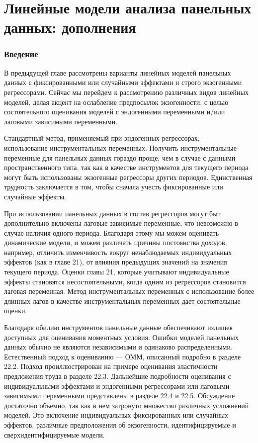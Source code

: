 
\chapter{Линейные модели анализа панельных данных: дополнения}

\subsection{Введение}
В предыдущей главе рассмотрены варианты линейных моделей панельных данных с фиксированными или случайными эффектами и строго экзогенными регрессорами. Сейчас мы перейдем к рассмотрению различных видов линейных моделей, делая акцент на ослабление предпосылок экзогенности, с целью состоятельного оценивания моделей с эндогенными переменными и/или лаговыми зависимыми переменными.

Стандартный метод, применяемый при эндогенных регрессорах, --- использование инструментальных переменных. Получить инструментальные переменные для панельных данных гораздо проще, чем в случае с данными пространственного типа, так как в качестве инструментов для текущего периода могут быть использованы экзогенные регрессоры других периодов. Единственная трудность заключается в том, чтобы сначала учесть фиксированные или случайные эффекты.

При использовании панельных данных в состав регрессоров могут быт дополнительно включены лаговые зависимые переменные, что невозможно в случае наличия одного периода. Благодаря этому мы можем оценивать динамические модели, и можем различать причины постоянства доходов, например, отличить изменчивость вокруг ненаблюдаемых индивидуальных эффектов (как в главе 21), от влияния предыдущих значений на значения текущего периода. Оценки главы 21, которые учитывают индивидуальные  эффекты становятся несостоятельными, когда одним из регрессоров становится лаговая переменная. Метод инструментальных переменных с использование более длинных лагов в качестве инструментальных переменных дает состоятельные оценки.

Благодаря обилию инструментов панельные данные обеспечивают излишек доступных для оценивания моментных условия. Ошибки моделей панельных данных обычно не являются независимыми и одинаково распределенными. Естественный подход к оцениванию --- ОММ, описанный подробно в разделе 22.2. Подход проиллюстрирован на примере оценивания эластичности предложения труда в разделе 22.3. Дальнейшие подробности оценивания с индивидуальными эффектами и эндогенными регрессорами или лаговыми зависимыми переменными представлены в разделе 22.4 и 22.5. Обсуждение достаточно объемно, так как в нем затронуто множество различных усложнений моделей. Это включение индивидуальных фиксированных или случайных эффектов, различные предположения об экзогенности, идентифицируемые и сверхидентифицируемые модели.

